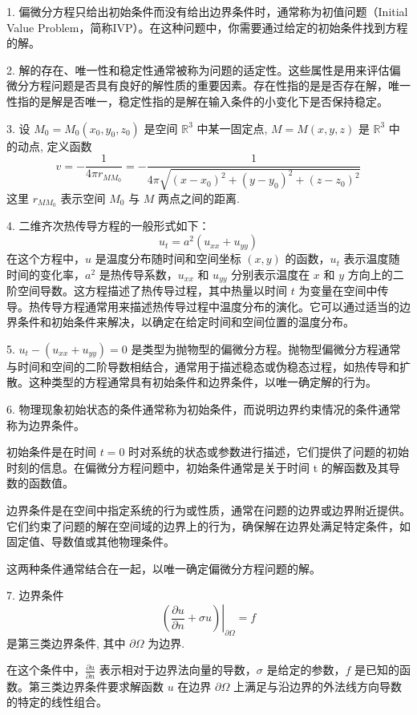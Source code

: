 1. 偏微分方程只给出初始条件而没有给出边界条件时，通常称为初值问题（Initial Value Problem，简称IVP）。在这种问题中，你需要通过给定的初始条件找到方程的解。

2. 解的存在、唯一性和稳定性通常被称为问题的适定性。这些属性是用来评估偏微分方程问题是否具有良好的解性质的重要因素。存在性指的是是否存在解，唯一性指的是解是否唯一，稳定性指的是解在输入条件的小变化下是否保持稳定。

3. 设 $ M_{0}=M_{0}\left(x_{0}, y_{0}, z_{0}\right) $ 是空间 $ \mathbb{R}^{3} $ 中某一固定点, $ M=M(x, y, z) $ 是 $ \mathbb{R}^{3} $ 中的动点, 定义函数
$$
v=-\frac{1}{4 \pi r_{M M_{0}}}=-\frac{1}{4 \pi \sqrt{\left(x-x_{0}\right)^{2}+\left(y-y_{0}\right)^{2}+\left(z-z_{0}\right)^{2}}}
$$
这里 $ r_{M M_{0}} $ 表示空间 $ M_{0} $ 与 $ M $ 两点之间的距离.

4. 二维齐次热传导方程的一般形式如下：
$$ u_t = a^2(u_{xx} +u_{yy})$$
在这个方程中，$u$ 是温度分布随时间和空间坐标 $(x, y)$ 的函数，$u_{t}$ 表示温度随时间的变化率，$a^2$ 是热传导系数，$u_{xx}$ 和 $u_{yy}$ 分别表示温度在 $x$ 和 $y$ 方向上的二阶空间导数。这方程描述了热传导过程，其中热量以时间 $t$ 为变量在空间中传导。热传导方程通常用来描述热传导过程中温度分布的演化。它可以通过适当的边界条件和初始条件来解决，以确定在给定时间和空间位置的温度分布。

5. $ u_{t}-\left(u_{xx}+u_{yy}\right)=0 $ 是类型为抛物型的偏微分方程。抛物型偏微分方程通常与时间和空间的二阶导数相结合，通常用于描述稳态或伪稳态过程，如热传导和扩散。这种类型的方程通常具有初始条件和边界条件，以唯一确定解的行为。

6. 物理现象初始状态的条件通常称为初始条件，而说明边界约束情况的条件通常称为边界条件。

初始条件是在时间 $t = 0$ 时对系统的状态或参数进行描述，它们提供了问题的初始时刻的信息。在偏微分方程问题中，初始条件通常是关于时间 t 的解函数及其导数的函数值。

边界条件是在空间中指定系统的行为或性质，通常在问题的边界或边界附近提供。它们约束了问题的解在空间域的边界上的行为，确保解在边界处满足特定条件，如固定值、导数值或其他物理条件。

这两种条件通常结合在一起，以唯一确定偏微分方程问题的解。

7. 边界条件 
$$ \left.\left(\frac{\partial u}{\partial n}+\sigma u\right)\right|_{\partial \Omega}=f $$
是第三类边界条件, 其中 $ \partial \Omega $ 为边界.

在这个条件中，$ \frac{\partial u}{\partial n} $ 表示相对于边界法向量的导数，$ \sigma $ 是给定的参数，$ f $ 是已知的函数。第三类边界条件要求解函数 $ u $ 在边界 $ \partial \Omega $ 上满足与沿边界的外法线方向导数的特定的线性组合。


